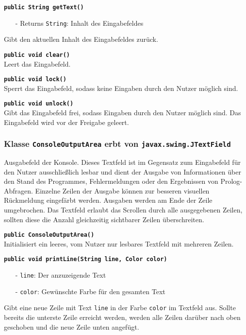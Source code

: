 \documentclass[parskip=full,11pt,twoside]{scrartcl}
\begin{document}
\textbf{\texttt{public String getText()}}
\begin{itemize}[noitemsep]
	\item[-] Returns \texttt{String}: Inhalt des Eingabefeldes
\end{itemize}
Gibt den aktuellen Inhalt des Eingabefeldes zurück.

\textbf{\texttt{public void clear()}}\\
Leert das Eingabefeld.

\textbf{\texttt{public void lock()}}\\
Sperrt das Eingabefeld, sodass keine Eingaben durch den Nutzer möglich sind.

\textbf{\texttt{public void unlock()}}\\
Gibt das Eingabefeld frei, sodass Eingaben durch den Nutzer möglich sind. Das Eingabefeld wird vor der Freigabe geleert.

\subsubsection{Klasse \texttt{ConsoleOutputArea} erbt von \texttt{javax.swing.JTextField}}

Ausgabefeld der Konsole. Dieses Textfeld ist im Gegensatz zum Eingabefeld für den Nutzer ausschließlich lesbar und dient der Ausgabe von Informationen über den Stand des Programmes, Fehlermeldungen oder den Ergebnissen von Prolog-Abfragen. Einzelne Zeilen der Ausgabe können zur besseren visuellen Rückmeldung eingefärbt werden. Ausgaben werden am Ende der Zeile umgebrochen. Das Textfeld erlaubt das Scrollen durch alle ausgegebenen Zeilen, sollten diese die Anzahl gleichzeitig sichtbarer Zeilen überschreiten.

\textbf{\texttt{public ConsoleOutputArea()}}\\
Initialisiert ein leeres, vom Nutzer nur lesbares Textfeld mit mehreren Zeilen.

\textbf{\texttt{public void printLine(String line, Color color)}}
\begin{itemize}[noitemsep]
	\item[-] \texttt{line}: Der anzuzeigende Text
	\item[-] \texttt{color}: Gewünschte Farbe für den gesamten Text
\end{itemize}
Gibt eine neue Zeile mit Text \texttt{line} in der Farbe \texttt{color} im Textfeld aus. Sollte bereits die unterste Zeile erreicht werden, werden alle Zeilen darüber nach oben geschoben und die neue Zeile unten angefügt.
\end{document}
